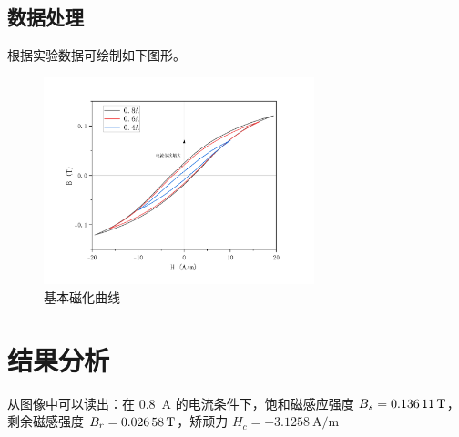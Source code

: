 \subsection{数据处理}
根据实验数据可绘制如下图形。
\begin{figure}[!ht]
    \begin{floatrow}
    \end{floatrow}
\end{figure}
\begin{figure}[!ht]
    \caption{基本磁化曲线}
    \includegraphics[width=0.7\textwidth]{img/A8/fig1c.pdf}
\end{figure}
\section{结果分析}
从图像中可以读出：在 \SI{0.8}{\A} 的电流条件下，饱和磁感应强度 $B_s=\SI{0.13611}{\T}$，剩余磁感强度 $B_r=\SI{0.02658}{\T}$，矫顽力 $H_c=\SI{-3.1258}{\A\per\m}$
